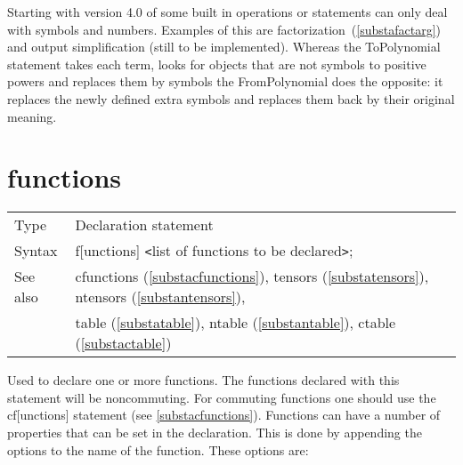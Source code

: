 \noindent Starting with version 4.0 of \FORM{} some built in operations or
statements can only deal with symbols and numbers. Examples of this are 
factorization~(\ref{substafactarg}) and output simplification (still to be 
implemented). Whereas the ToPolynomial statement takes each term, looks for objects 
that are not symbols to positive powers and replaces them by symbols the 
FromPolynomial does the opposite: it replaces the newly defined extra 
symbols and replaces them back by their original meaning.
\vspace{10mm}

 
\section{functions}
\label{substafunctions}

\noindent \begin{tabular}{ll}
Type & Declaration statement\\
Syntax & f[unctions] {\tt<}list of functions to be declared{\tt>}; \\
See also & cfunctions (\ref{substacfunctions}), 
           tensors (\ref{substatensors}),
           ntensors (\ref{substantensors}), \\ &
           table (\ref{substatable}),
           ntable (\ref{substantable}),
           ctable (\ref{substactable})
\end{tabular} \vspace{4mm}

\noindent Used to declare one or more functions. The functions declared 
with this statement will be noncommuting. For 
commuting functions one 
should use the cf[unctions] statement (see \ref{substacfunctions}). 
Functions can have a number of properties that can be set in the 
declaration. This is done by appending the options to the name of the 
function. These options are:




